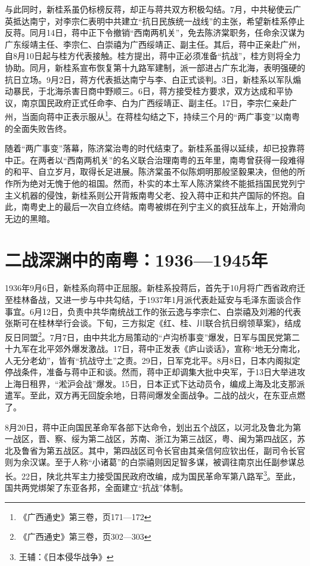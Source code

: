 与此同时，新桂系虽仍标榜反蒋，却正与蒋共双方积极勾结。7月，中共秘使云广英抵达南宁，对李宗仁表明中共建立“抗日民族统一战线”的主张，希望新桂系停止反蒋。同月14日，蒋中正下令撤销“西南两机关”，免去陈济棠职务，任命余汉谋为广东绥靖主任、李宗仁、白崇禧为广西绥靖正、副主任。其后，蒋中正亲赴广州，自8月10日起与桂方代表接触。桂方提出，蒋中正必须准备“抗战”，桂方则将全力协助。同月，新桂系宣布恢复第十九路军建制，派一部进占广东北海，表明强硬的抗日立场。9月2日，蒋方代表抵达南宁与李、白正式谈判。3日，新桂系以军队煽动暴民，于北海杀害日商中野顺三。6日，蒋方接受桂方要求，双方达成和平协议，南京国民政府正式任命李、白为广西绥靖正、副主任。17日，李宗仁亲赴广州，当面向蒋中正表示服从\footnote{《广西通史》第三卷，页171—172}。在蒋桂勾结之下，持续三个月的“两广事变”以南粤的全面失败告终。

随着“两广事变”落幕，陈济棠治粤的时代结束了。新桂系虽得以延续，却已投靠蒋中正。在两者以“西南两机关”的名义联合治理南粤的五年里，南粤曾获得一段难得的和平、自立岁月，取得长足进展。陈济棠虽不似陈炯明那般坚毅果决，但他的所作所为绝对无愧于他的祖国。然而，朴实的本土军人陈济棠终不能抵挡国民党列宁主义机器的侵蚀，新桂系则公开背叛南粤父老、投入蒋中正和共产国际的怀抱。自此，南粤史上的最后一次自立终结。南粤被绑在列宁主义的疯狂战车上，开始滑向无边的黑暗。

\section{二战深渊中的南粤：1936—1945年}

\indent 1936年9月6日，新桂系向蒋中正屈服。新桂系投蒋后，首先于10月将广西省政府迁至桂林备战，又进一步与中共勾结，于1937年1月派代表赴延安与毛泽东面谈合作事宜。6月12日，负责中共华南统战工作的张云逸与李宗仁、白崇禧及刘湘的代表张斯可在桂林举行会谈。下旬，三方拟定《红、桂、川联合抗日纲领草案》，结成反日同盟\footnote{《广西通史》第三卷，页302—303}。7月7日，由中共北方局策动的“卢沟桥事变”爆发，日军与国民党第二十九军在北平郊外爆发激战。17日，蒋中正发表《庐山谈话》，宣称“地无分南北，人无分老幼”，皆有“抗战守土”之责。29日，日军克北平。8月8日，日本内阁拟定停战条件，准备与蒋中正和谈。然而，蒋中正却调集大批中央军，于13日大举进攻上海日租界，“淞沪会战”爆发。15日，日本正式下达动员令，编成上海及北支那派遣军。至此，双方再无回旋余地，日蒋间爆发全面战争。二战的战火，在东亚点燃了。

8月20日，蒋中正向国民革命军各部下达命令，划出五个战区，以河北及鲁北为第一战区，晋、察、绥为第二战区，苏南、浙江为第三战区，粤、闽为第四战区，苏北及鲁省为第五战区。其中，第四战区司令长官由其亲信何应钦出任，副司令长官则为余汉谋。至于人称“小诸葛”的白崇禧则因足智多谋，被调往南京出任副参谋总长。22日，陕北共军主力接受国民政府改编，成为国民革命军第八路军\footnote{王辅：《日本侵华战争》}。至此，国共两党绑架了东亚各邦，全面建立“抗战”体制。

